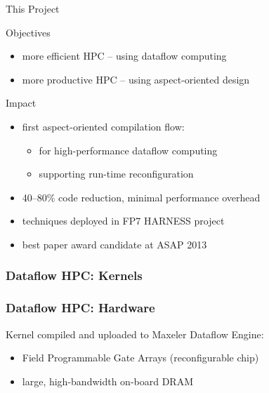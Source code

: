 \begin{frame}{This Project}
  \begin{beamerboxesrounded}{Objectives}
    \begin{itemize}
    \item more efficient HPC -- using dataflow computing
    \item more productive HPC -- using aspect-oriented design
    \end{itemize}
  \end{beamerboxesrounded}
  \vspace{0.5cm}
  \begin{beamerboxesrounded}{Impact}
    \begin{itemize}
      \item first aspect-oriented compilation flow:
      \begin{itemize}
      \item for high-performance dataflow computing
      \item supporting run-time reconfiguration
      \end{itemize}
    \item 40--80\% code reduction, minimal performance overhead
    \item techniques deployed in FP7 HARNESS project
    \item best paper award candidate at ASAP 2013
    \end{itemize}
  \end{beamerboxesrounded}
\end{frame}

\begin{frame}
  \frametitle{Dataflow HPC: Kernels}
  \begin{figure}[!ht]
    \centering
    \def\svgwidth{0.7\linewidth}
    
  \end{figure}
\end{frame}

\begin{frame}
  \frametitle{Dataflow HPC: Hardware}
  Kernel compiled and uploaded to Maxeler Dataflow Engine:
  \begin{itemize}
  \item Field Programmable Gate Arrays (reconfigurable chip)
  \item large, high-bandwidth on-board DRAM
  \end{itemize}
  \begin{figure}[!ht]
    \centering
    \def\svgwidth{\linewidth}
    
  \end{figure}
\end{frame}


